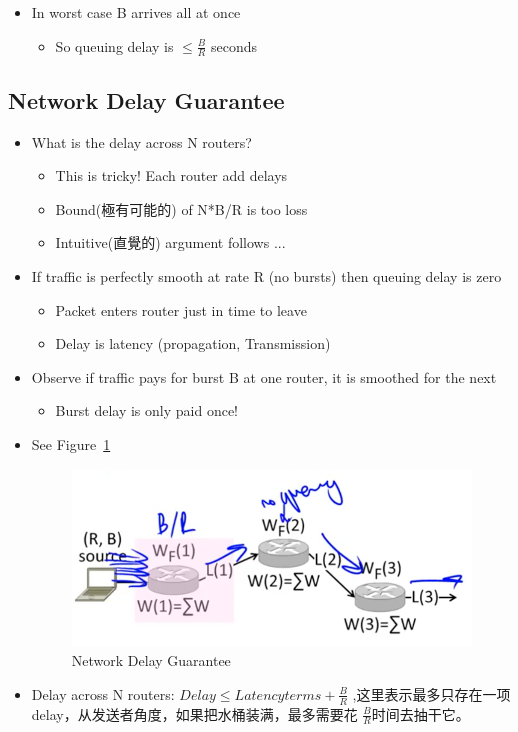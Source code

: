 \documentclass[12pt]{ctexart}   %
\begin{document}
\begin{itemize}
		\item  In worst case B arrives all at once
		\begin{itemize}
			\item So queuing delay is $\leqslant \frac{B}{R}$ seconds
		\end{itemize}
	\end{itemize}

	\subsection{Network Delay Guarantee}
	\begin{itemize}
		\item What is the delay across N routers?
		\begin{itemize}
			\item This is tricky! Each router add delays
			\item Bound(極有可能的) of N*B/R is too loss
			\item Intuitive(直覺的) argument follows ...
		\end{itemize}

		\item If traffic is perfectly smooth at rate R (no bursts) then queuing delay is zero
		\begin{itemize}
			\item Packet enters router just in time to leave
			\item Delay is latency (propagation, Transmission)
		\end{itemize}

		\item  Observe if traffic pays for burst B at one router, it is smoothed for the next
		\begin{itemize}
			\item Burst delay is only paid once!
		\end{itemize}
		\item See Figure~\ref{fig:9-7-8}
		  
		\begin{figure}[h!] %
		\centering
		\includegraphics[scale=0.7]{images/9-7-8}
		\caption{Network Delay Guarantee}
		\label{fig:9-7-8}
		\end{figure}

		\item Delay across N routers:   $Delay \leqslant Latency terms + \frac{B}{R}$  ,这里表示最多只存在一项delay，从发送者角度，如果把水桶装满，最多需要花 $\frac{B}{R}$时间去抽干它。
	\end{itemize}
\end{document}
